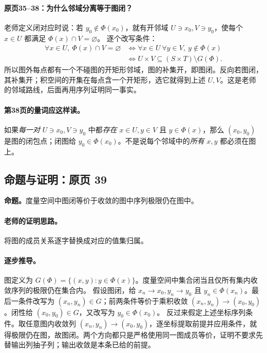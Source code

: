 \documentclass[11pt,a4paper]{article}
\theoremstyle{definition}\newtheorem{definition}{定义}\newtheorem{example}{例}
\begin{document}
\paragraph{原页35--38：为什么邻域分离等于图闭？}
老师定义闭对应时说：若 $y_0\notin\Phi(x_0)$，就有开邻域 $U\ni x_0,V\ni y_0$，使每个 $x\in U$ 都满足 $\Phi(x)\cap V=\varnothing$。
逐个改写条件：
\begin{align*}
\forall x\in U,\ \Phi(x)\cap V=\varnothing
&\iff\forall x\in U\ \forall y\in V,\ y\notin\Phi(x)\\
&\iff U\times V\subseteq(S\times T)\setminus G(\Phi).
\end{align*}
所以图外每点都有一个不碰图的开矩形邻域，图的补集开，即图闭。反向若图闭，其补集开；积空间的开集在每点含一个开矩形，选它就得到上述 $U,V$。这是老师的邻域路线，后面再用序列证明同一事实。

\paragraph{第38页的量词应这样读。}
如果\emph{每一对} $U\ni x_0,V\ni y_0$ 中都\emph{存在} $x\in U,y\in V$ 且 $y\in\Phi(x)$，那么 $(x_0,y_0)$ 是图的闭包点；闭图给 $y_0\in\Phi(x_0)$。不是说每个邻域中的\emph{所有} $x,y$ 都必须在图上。


\subsection{命题与证明：原页 39}

\textbf{命题。}度量空间中图闭等价于收敛的图中序列极限仍在图中。

\paragraph{老师的证明思路。}将图的成员关系逐字替换成对应的值集归属。

\paragraph{逐步推导。}
图定义为 $G(\Phi)=\{(x,y):y\in\Phi(x)\}$。度量空间中集合闭当且仅所有集内收敛序列的极限仍在集合内。
假设图闭，给 $x_n\to x_0,y_n\to y_0$ 且 $y_n\in\Phi(x_n)$。最后一条件改写为 $(x_n,y_n)\in G$；前两条件等价于乘积收敛 $(x_n,y_n)\to(x_0,y_0)$。闭性给 $(x_0,y_0)\in G$，又改写为 $y_0\in\Phi(x_0)$。
反过来假定上述坐标序列条件。取任意图内收敛列 $(x_n,y_n)\to(x_0,y_0)$，逐坐标提取前提并应用条件，就得极限仍在图，故图闭。两个方向都只是严格使用同一图成员等价，证明不要求先替输出列抽子列；输出收敛是本条已给的前提。
\end{document}
